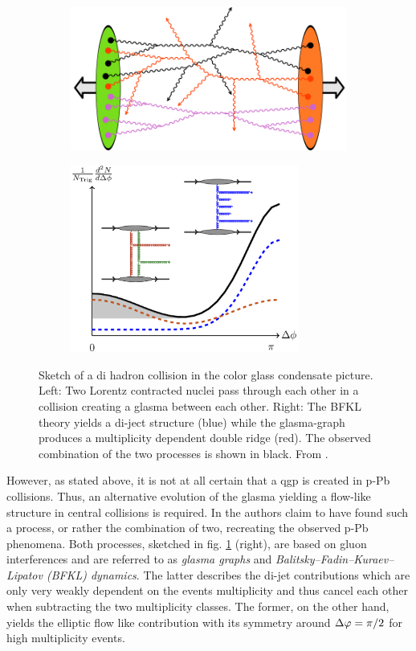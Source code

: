 \begin{figure}
  \centering
  \begin{subfigure}[m]{0.5\textwidth}
    \includegraphics[width=\textwidth]{figures/glasma.png}
  \end{subfigure}%
  \begin{subfigure}[m]{0.5\textwidth}
  \includegraphics[width=2.95in]{figures/cgc_sketch.png}
  \end{subfigure}
  \caption[Sketch of a di hadron collision in the color glass condensate picture.]{Sketch of a di hadron collision in the color glass condensate picture. Left: Two Lorentz contracted nuclei pass through each other in a collision creating a glasma between each other. Right: The BFKL theory yields a di-ject structure (blue) while the glasma-graph produces a multiplicity dependent double ridge (red). The observed combination of the two processes is shown in black. From \cite{Dusling2012,Gelis2013}.}
  \label{fig:cgc_sketch}
\end{figure}

However, as stated above, it is not at all certain that a \gls{qgp} is created in p-Pb collisions. Thus, an alternative evolution of the glasma yielding a flow-like structure in central collisions is required. In \cite{Dusling2013} the authors claim to have found such a process, or rather the combination of two, recreating the observed p-Pb phenomena. Both processes, sketched in fig. \ref{fig:cgc_sketch} (right), are based on gluon interferences and are referred to as \emph{glasma graphs} and \emph{Balitsky–Fadin–Kuraev–Lipatov (BFKL) dynamics}. The latter describes the di-jet contributions which are only very weakly dependent on the events multiplicity and thus cancel each other when subtracting the two multiplicity classes. The former, on the other hand, yields the elliptic flow like contribution with its symmetry around $\Delta\varphi = \pi / 2$ for high multiplicity events.

